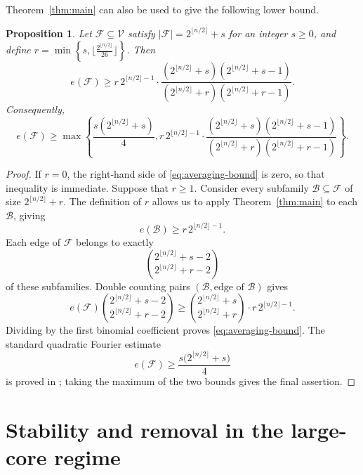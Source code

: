 \documentclass[11pt]{article}
\newtheorem{proposition}[theorem]{Proposition}
\begin{document}
Theorem~\ref{thm:main} can also be used to give
the following lower bound.

\begin{proposition}\label{prop:averaging}
Let \(\mathcal F\subseteq\mathcal V\) satisfy
\(|\mathcal F|=2^{\lfloor n/2\rfloor}+s\) for an integer \(s\ge0\), and define
\(r=
 \min\left\{
 s, \lfloor\frac{2^{\lfloor n/2\rfloor}}{26}\rfloor
 \right\}\). Then
\begin{equation}
 e(\mathcal F)
 \ge
 r\,2^{\lfloor n/2\rfloor-1}
 \cdot
 \frac{
 (2^{\lfloor n/2\rfloor}+s)
 (2^{\lfloor n/2\rfloor}+s-1)
 }{
 (2^{\lfloor n/2\rfloor}+r)
 (2^{\lfloor n/2\rfloor}+r-1)
 }.
\label{eq:averaging-bound}
\end{equation}
Consequently,
\[
 e(\mathcal F)
 \ge
 \max\left\{
 \frac{s(2^{\lfloor n/2\rfloor}+s)}{4},
 r\,2^{\lfloor n/2\rfloor-1}
 \cdot
 \frac{
 (2^{\lfloor n/2\rfloor}+s)
 (2^{\lfloor n/2\rfloor}+s-1)
 }{
 (2^{\lfloor n/2\rfloor}+r)
 (2^{\lfloor n/2\rfloor}+r-1)
 }
 \right\}.
\]
\end{proposition}

\begin{proof}
If \(r=0\), the right-hand side of \eqref{eq:averaging-bound} is zero, so
that inequality is immediate.  Suppose that \(r\ge1\).  Consider every
subfamily \(\mathcal B\subseteq\mathcal F\) of size
\(2^{\lfloor n/2\rfloor}+r\).  The definition of \(r\) allows us to apply
Theorem~\ref{thm:main} to each \(\mathcal B\), giving
\[
 e(\mathcal B)\ge r\,2^{\lfloor n/2\rfloor-1}.
\]
Each edge of \(\mathcal F\) belongs to exactly
\[
 \binom{2^{\lfloor n/2\rfloor}+s-2}
       {2^{\lfloor n/2\rfloor}+r-2}
\]
of these subfamilies.  Double counting pairs
\((\mathcal B,\text{edge of }\mathcal B)\) gives
\[
 e(\mathcal F)
 \binom{2^{\lfloor n/2\rfloor}+s-2}
       {2^{\lfloor n/2\rfloor}+r-2}
 \ge
 \binom{2^{\lfloor n/2\rfloor}+s}
       {2^{\lfloor n/2\rfloor}+r} 
 \cdot r\,2^{\lfloor n/2\rfloor-1}.
\]
Dividing by the first binomial coefficient proves
\eqref{eq:averaging-bound}.  The standard quadratic Fourier estimate
\[
 e(\mathcal F)
 \ge
 \frac{s\bigl(2^{\lfloor n/2\rfloor}+s\bigr)}{4}
\]
is proved in \cite{WeiZhaoZhangGe}; taking the maximum of the two bounds gives
the final assertion.
\end{proof}

\section{Stability and removal in the large-core regime}\label{sec:stability}
\end{document}
